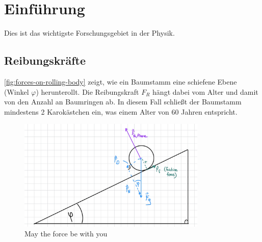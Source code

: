 \section{Einführung}

Dies ist das wichtigste Forschungsgebiet in der Physik.


\subsection{Reibungskräfte}

\autoref{fig:forces-on-rolling-body} zeigt, wie ein Baumstamm eine schiefene Ebene (Winkel $\varphi$) herunterollt. Die Reibungskraft $F_R$ hängt dabei vom Alter und damit von den Anzahl an Baumringen ab. In diesem Fall schließt der Baumstamm mindestens 2 Karokästchen ein, was einem Alter von 60 Jahren entspricht.

\begin{figure}[h]
    \centering
    \includegraphics[width=0.8\textwidth]{assets/forces.jpg}
    \caption{May the force be with you}
    \label{fig:forces-on-rolling-body}
\end{figure}

